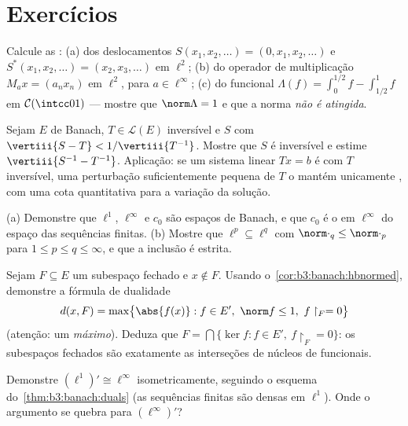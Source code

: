 \section{Exercícios}

\begin{exercise}[$\star$]\label{exo:b3:banach:1}
Calcule as :
(a) dos deslocamentos $S(x_1, x_2, \dots) = (0, x_1, x_2, \dots)$ e $S^*(x_1, x_2, \dots) = (x_2, x_3, \dots)$ em $\ell^2$;
(b) do operador de multiplicação $M_a x = (a_nx_n)$ em $\ell^2$, para $a \in \ell^\infty$;
(c) do funcional $\Lambda(f) = \int_0^{1/2}f -
\int_{1/2}^1f$ em $\mathcal C(\intcc01)$ --- mostre que $\norm\Lambda = 1$ e que a norma
\emph{não é atingida}.
\end{exercise}

\begin{exercise}[$\star$]\label{exo:b3:banach:2}
Sejam $E$ de Banach, $T \in \mathcal L(E)$ inversível e $S$ com $\vertiii{S - T} < 1/\vertiii{T^{-1}}$. Mostre que
$S$ é inversível e estime $\vertiii{S^{-1} - T^{-1}}$. Aplicação: se um sistema linear
$Tx = b$ é  com $T$ inversível, uma perturbação
suficientemente pequena de $T$ o mantém unicamente , com uma
cota quantitativa para a variação da solução.
\end{exercise}

\begin{exercise}[$\star\star$]\label{exo:b3:banach:3}
(a) Demonstre que $\ell^1$, $\ell^\infty$ e $c_0$ são espaços de Banach,
e que $c_0$ é o  em $\ell^\infty$ do espaço das sequências finitas.
(b) Mostre que $\ell^p \subseteq \ell^q$ com $\norm\cdot_q \leq
\norm\cdot_p$ para $1 \leq p \leq q \leq \infty$, e que a inclusão é estrita.
\end{exercise}

\begin{exercise}[$\star\star$]\label{exo:b3:banach:4}
Sejam $F \subseteq E$ um subespaço fechado e $x \notin F$. Usando o~\cref{cor:b3:banach:hbnormed},
demonstre a fórmula de dualidade
\[
d(x, F) = \max\bigl\{\abs{f(x)} : f \in E',\ \norm f \leq 1,\
f\restriction_F = 0\bigr\}
\]
(atenção: um \emph{máximo}). Deduza que $F = \bigcap\{\ker f : f
\in E',\ f\restriction_F = 0\}$: os subespaços fechados
são exatamente as interseções de núcleos de funcionais.
\end{exercise}

\begin{exercise}[$\star\star$]\label{exo:b3:banach:5}
Demonstre $(\ell^1)' \cong \ell^\infty$ isometricamente, seguindo o esquema do~\cref{thm:b3:banach:duals}
(as sequências finitas são densas em $\ell^1$). Onde o argumento se
quebra para $(\ell^\infty)'$?
\end{exercise}

